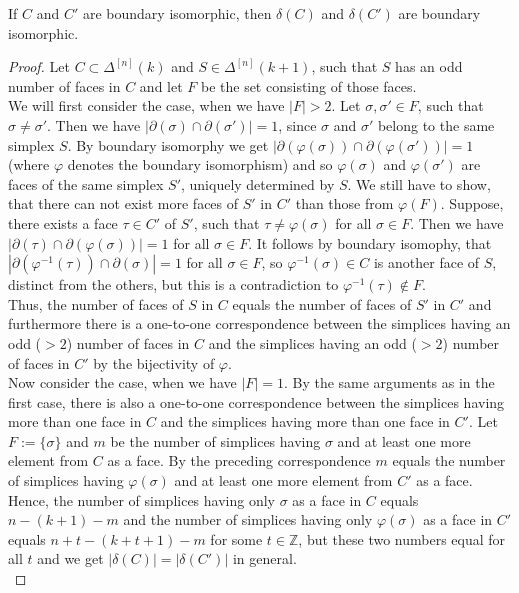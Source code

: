 \begin{prop}\label{proposition6}
If \(C\) and \(C'\) are boundary isomorphic, then \(\delta(C)\) and \(\delta(C')\) are boundary isomorphic.
\begin{proof}
Let \(C\subset\Delta^{[n]}(k)\) and \(S\in\Delta^{[n]}(k+1)\), such that \(S\) has an odd number of faces in \(C\) and let \(F\) be the set consisting of those faces.\\
We will first consider the case, when we have \(|F|>2\). Let \(\sigma,\sigma'\in F\), such that \(\sigma\neq\sigma'\). Then we have \(|\partial(\sigma)\cap\partial(\sigma')|=1\), since \(\sigma\) and \(\sigma'\) belong to the same simplex \(S\). By boundary isomorphy we get \(|\partial(\varphi(\sigma))\cap\partial(\varphi(\sigma'))|=1\) (where \(\varphi\) denotes the boundary isomorphism) and so \(\varphi(\sigma)\) and \(\varphi(\sigma')\) are faces of the same simplex \(S'\), uniquely determined by \(S\). We still have to show, that there can not exist more faces of \(S'\) in \(C'\) than those from \(\varphi(F)\). Suppose, there exists a face \(\tau\in C'\) of \(S'\), such that \(\tau\neq\varphi(\sigma)\) for all \(\sigma\in F\). Then we have \(|\partial(\tau)\cap\partial(\varphi(\sigma))|=1\) for all \(\sigma\in F\). It follows by boundary isomophy, that \(|\partial(\varphi^{-1}(\tau))\cap\partial(\sigma)|=1\) for all \(\sigma\in F\), so \(\varphi^{-1}(\sigma)\in C\) is another face of \(S\), distinct from the others, but this is a contradiction to \(\varphi^{-1}(\tau)\notin F\).\\
Thus, the number of faces of \(S\) in \(C\) equals the number of faces of \(S'\) in \(C'\) and furthermore there is a one-to-one correspondence between the simplices having an odd (\(>2\)) number of faces in \(C\) and the simplices having an odd (\(>2\)) number of faces in \(C'\) by the bijectivity of \(\varphi\).\\
Now consider the case, when we have \(|F|=1\). By the same arguments as in the first case, there is also a one-to-one correspondence between the simplices having more than one face in \(C\) and the simplices having more than one face in \(C'\). Let \(F:=\{\sigma\}\) and \(m\) be the number of simplices having \(\sigma\) and at least one more element from \(C\) as a face. By the preceding correspondence \(m\) equals the number of simplices having \(\varphi(\sigma)\) and at least one more element from \(C'\) as a face. Hence, the number of simplices having only \(\sigma\) as a face in \(C\) equals \(n-(k+1)-m\) and the number of simplices having only \(\varphi(\sigma)\) as a face in \(C'\) equals \(n+t-(k+t+1)-m\) for some \(t\in\mathbb{Z}\), but these two numbers equal for all \(t\) and we get \(|\delta(C)|=|\delta(C')|\) in general.\\

\end{proof}
\end{prop}
